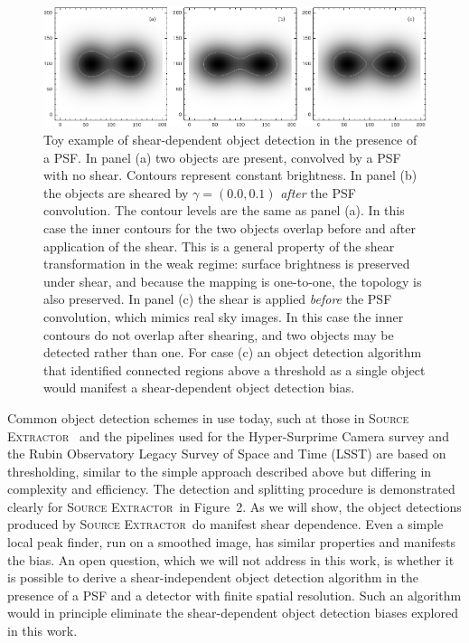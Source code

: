 \documentclass[iop, twocolappendix, appendixfloats, numberedappendix, apj]{hackemulateapj}
\newcommand{\sx}{\textsc{Source Extractor}}
\begin{document}
\begin{figure}
    \begin{center}
        \includegraphics[width=\textwidth]{toy.pdf}

        \caption{ Toy example of shear-dependent object detection in the presence of
        a PSF.  In panel (a) two objects are present, convolved by a PSF with no
        shear.  Contours represent constant brightness.  In panel (b) the objects
        are sheared by $\gamma = (0.0, 0.1)$ {\em after} the PSF convolution.  The
        contour levels are the same as panel (a).  In this case the inner contours
        for the two objects overlap before and after application of the shear. This
        is a general property of the shear transformation in the weak regime:
        surface brightness is preserved under shear, and because the mapping is
        one-to-one, the topology is also preserved. In panel (c) the shear is
        applied {\em before} the PSF convolution, which mimics real sky images. In
        this case the inner contours do not overlap after shearing, and two objects
        may be detected rather than one.  For case (c) an object detection
        algorithm that identified connected regions above a threshold as a single
        object would manifest a shear-dependent object detection bias.
        \label{fig:toy} }
    \end{center}

\end{figure}


Common object detection schemes in use today, such at those in \sx\
\citep{Bertin96} and the pipelines used for the Hyper-Surprime Camera survey
and the Rubin Observatory Legacy Survey of Space and Time (LSST)
\citep{BoschHSC2018,BoschLSST2018} are based on thresholding, similar to the
simple approach described above but differing in complexity and efficiency.
The detection and splitting procedure is demonstrated clearly for \sx\ in
\cite{Bertin96} Figure~2.  As we will show, the object detections
produced by \sx\ do manifest shear dependence.  Even a simple local peak
finder, run on a smoothed image, has similar properties and manifests the bias.
An open question, which we will not address in this work, is whether it is
possible to derive a shear-independent object detection algorithm in the
presence of a PSF and a detector with finite spatial resolution.  Such an
algorithm would in principle eliminate the shear-dependent object detection
biases explored in this work.
\end{document}
